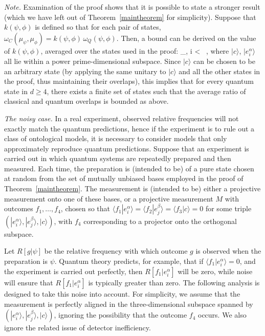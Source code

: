 \textit{Note.} Examination of the proof shows that it is possible to state a stronger result (which we have left out of Theorem~\ref{maintheorem} for simplicity). Suppose that $k(\psi,\phi)$ is defined so that for each pair of states, $\omega_C(\mu_\psi,\mu_\phi) = k(\psi,\phi) \, \omega_Q(\psi,\phi)$. Then, a bound can be derived on the value of $k(\psi,\phi)$, averaged over the states used in the proof: 
\be
\sum_{\alpha, i}  <  \, ,
\ee
where $|c\rangle$, $|e^\alpha_i\rangle$ all lie within a power prime-dimensional subspace. Since $|c\rangle$ can be chosen to be an arbitrary state (by applying the same unitary to $|c\rangle$ and all the other states in the proof, thus maintaining their overlaps), this implies that for every quantum state in $d\geq4$, there exists a finite set of states such that the average ratio of classical and quantum overlaps is bounded as above. 

\textit{The noisy case.} In a real experiment, observed relative frequencies will not exactly match the quantum predictions, hence if the experiment is to rule out a class of ontological models, it is necessary to consider models that only approximately reproduce quantum predictions. Suppose that an experiment is carried out in which quantum systems are repeatedly prepared and then measured. Each time, the preparation is (intended to be) of a pure state chosen at random from the set of mutually unbiased bases employed in the proof of Theorem~\ref{maintheorem}. The measurement is (intended to be) either a projective measurement onto one of these bases, or a projective measurement $M$ with outcomes $f_1,\ldots, f_4$, chosen so that $\langle f_1 | e^\alpha_i\rangle = \langle f_2 | e^\beta_j\rangle = \langle f_3 | c \rangle = 0$ for some triple $(|e^\alpha_i\rangle , | e^\beta_j \rangle , |c\rangle )$, with $f_4$ corresponding to a projector onto the orthogonal subspace.

Let $R[g|\psi]$ be the relative frequency with which outcome $g$ is observed when the preparation is $\psi$. Quantum theory predicts, for example, that if $\langle f_1|e^\alpha_i\rangle=0$, and the experiment is carried out perfectly, then $R[f_1 | e^\alpha_i]$ will be zero, while noise will ensure that $R[f_1 | e^\alpha_i]$ is typically greater than zero. The following analysis is designed to take this noise into account. For simplicity, we assume that the measurement is perfectly aligned in the three-dimensional subspace spanned by $(|e^\alpha_i\rangle , | e^\beta_j \rangle , |c\rangle )$, ignoring the possibility that the outcome $f_4$ occurs. We also ignore the related issue of detector inefficiency. 

